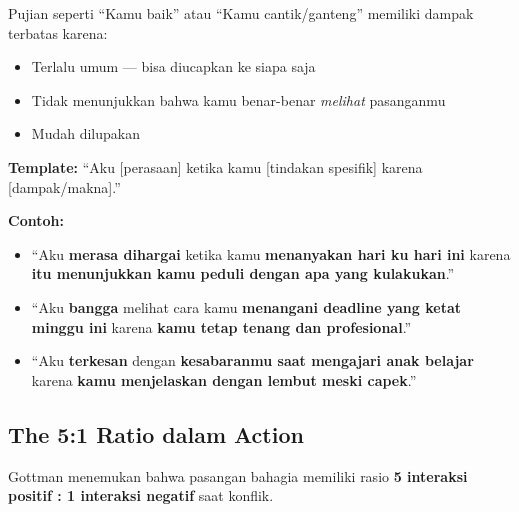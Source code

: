 \begin{warningbox}
Pujian seperti ``Kamu baik'' atau ``Kamu cantik/ganteng'' memiliki dampak terbatas karena:
\begin{itemize}
    \item Terlalu umum --- bisa diucapkan ke siapa saja
    \item Tidak menunjukkan bahwa kamu benar-benar \textit{melihat} pasanganmu
    \item Mudah dilupakan
\end{itemize}
\end{warningbox}

\begin{praktikbox}
\textbf{Template:} ``Aku [perasaan] ketika kamu [tindakan spesifik] karena [dampak/makna].''

\textbf{Contoh:}
\begin{itemize}
    \item ``Aku \textbf{merasa dihargai} ketika kamu \textbf{menanyakan hari ku hari ini} karena \textbf{itu menunjukkan kamu peduli dengan apa yang kulakukan}.''
    \item ``Aku \textbf{bangga} melihat cara kamu \textbf{menangani deadline yang ketat minggu ini} karena \textbf{kamu tetap tenang dan profesional}.''
    \item ``Aku \textbf{terkesan} dengan \textbf{kesabaranmu saat mengajari anak belajar} karena \textbf{kamu menjelaskan dengan lembut meski capek}.''
\end{itemize}
\end{praktikbox}

\subsection{The 5:1 Ratio dalam Action}

Gottman menemukan bahwa pasangan bahagia memiliki rasio \textbf{5 interaksi positif : 1 interaksi negatif} saat konflik.

\begin{center}
\end{center}


